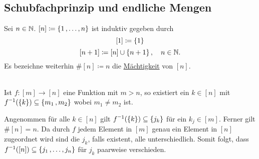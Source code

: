 \documentclass[../ana1.tex]{subfiles}
\begin{document}
\subsection{Schubfachprinzip und endliche Mengen}

\begin{notation}
	Sei \(n \in \mathbb{N} \). \([n] \coloneqq \{1 \operatorname{,} \ldots \operatorname{,} n\} \) ist induktiv gegeben durch
	\[[1] \coloneqq \{1\} \]
	\[[n + 1] \coloneqq [n] \cup \{n + 1\} \operatorname{,} \quad n \in \mathbb{N}.\]
	Es bezeichne weiterhin \(\#[n] \coloneqq n \) die \underline{Mächtigkeit} von \([n] \).
\end{notation}

\begin{satz*}[Schubfachprinzip]\label{satz:schubfach}\leavevmode \\
	Ist \(f \colon [m] \longrightarrow [n] \) eine Funktion mit \(m > n \), so existiert ein \(k \in [n]\) mit 
	\(\inverse{f}(\set{k}) \subseteq \set{m_1 \ko m_2} \) wobei \(m_1 \neq m_2 \) ist.
\end{satz*}
\begin{bew}
	Angenommen für alle \(k \in [n] \) gilt \(\inverse{f}(\set{k}) \subseteq \set{j_k} \) für ein \(k_j \in [m] \).
	Ferner gilt \(\#[n] = n \). Da durch \(f \) jedem Element in \([m] \) genau ein Element in \([n] \) zugeordnet wird
	sind die \(j_k \), falls existent, alle unterschiedlich.
	Somit folgt, dass \(\inverse{f}([n]) \subseteq \set{j_1 \ko \ldots \ko j_n} \) für \(j_k \) paarweise verschieden. 
\end{bew}
\end{document}
